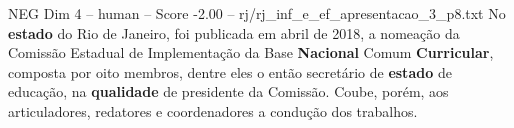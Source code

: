 \begin{textsample}{NEG Dim 4 – human – Score -2.00 – rj/rj\_inf\_e\_ef\_apresentacao\_3\_p8.txt}  \label{ex:f4_neg_008}
No \textbf{estado} do Rio de Janeiro, foi publicada em abril de 2018, a nomeação da Comissão Estadual de Implementação da Base \textbf{Nacional} Comum \textbf{Curricular}, composta por oito membros, dentre eles o então secretário de \textbf{estado} de educação, na \textbf{qualidade} de presidente da Comissão.
Coube, porém, aos articuladores, redatores e coordenadores a condução dos trabalhos.

\end{textsample}
